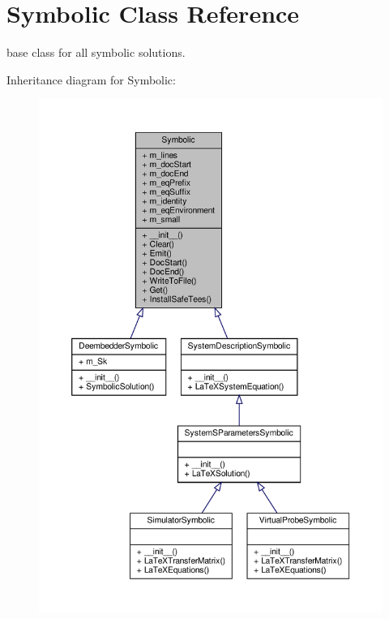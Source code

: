 \hypertarget{classSignalIntegrity_1_1SystemDescriptions_1_1Symbolic_1_1Symbolic}{}\section{Symbolic Class Reference}
\label{classSignalIntegrity_1_1SystemDescriptions_1_1Symbolic_1_1Symbolic}


base class for all symbolic solutions.  




Inheritance diagram for Symbolic\+:\nopagebreak
\begin{figure}[H]
\begin{center}
\leavevmode
\includegraphics[width=350pt]{classSignalIntegrity_1_1SystemDescriptions_1_1Symbolic_1_1Symbolic__inherit__graph}
\end{center}
\end{figure}


